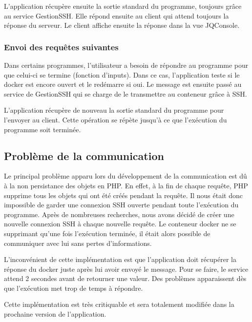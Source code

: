 \par L'application récupère ensuite la sortie standard du programme, toujours grâce au service GestionSSH. Elle répond ensuite au client qui attend toujours la réponse du serveur. Le client affiche ensuite la réponse dans la vue JQConsole.

\subsubsection{Envoi des requêtes suivantes}

\par Dans certains programmes, l'utilisateur a besoin de répondre au programme pour que celui-ci se termine (fonction d'inputs). Dans ce cas, l'application teste si le docker est encore ouvert et le redémarre si oui. Le message est ensuite passé au service de GestionSSH qui se charge de le transmettre au conteneur grâce à SSH.

\par L'application récupère de nouveau la sortie standard du programme pour l'envoyer au client. Cette opération se répète jusqu'à ce que l'exécution du programme soit terminée.

\subsection{Problème de la communication}

\par Le principal problème apparu lors du développement de la communication est dû à la non persistance des objets en PHP. En effet, à la fin de chaque requête, PHP supprime tous les objets qui ont été créés pendant la requête. Il nous était donc impossible de garder une connexion SSH ouverte pendant toute l'exécution du programme. Après de nombreuses recherches, nous avons décidé de créer une nouvelle connexion SSH à chaque nouvelle requête. Le conteneur docker ne se supprimant qu'une fois l'exécution terminée, il était alors possible de communiquer avec lui sans pertes d'informations.

\par L'inconvénient de cette implémentation est que l'application doit récupérer la réponse du docker juste après lui avoir envoyé le message. Pour se faire, le service attend 2 secondes avant de retourner une valeur. Des problèmes apparaissent dès que l'exécution met trop de temps à répondre.

\par Cette implémentation est très critiquable et sera totalement modifiée dans la prochaine version de l'application.
